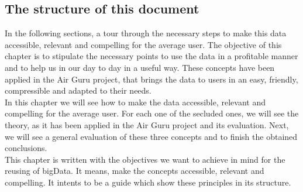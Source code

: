 \subsection*{The structure of this document}

In the following sections, a tour through the necessary steps to make this data
accessible, relevant and compelling for the average user.
The objective of this chapter is to stipulate the necessary points to use the data in a profitable manner and
to help us in our day to day in a useful way. These concepts have been applied in the Air Guru project,
that brings the data to users in an easy, friendly, compressible and adapted to their needs. \\

In this chapter we will see how to make the data accessible, relevant and compelling for 
the average user. For each one of the secluded ones, we will see the theory, as it has been applied
in the Air Guru project and its evaluation.
Next, we will see a general evaluation of these three concepts and to finish the 
obtained conclusions. \\

This chapter is written with the objectives we want to achieve in mind for the reusing of bigData. It means, make the 
concepts accessible, relevant and compelling. It intents to be a guide which show these principles
in its structure.

